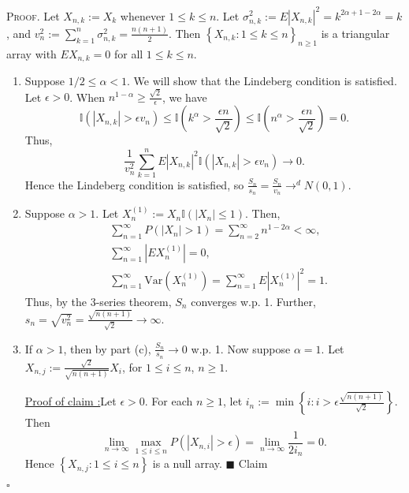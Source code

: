 \documentclass[12pt]{article}
\newcounter{ProofCounter}
\newcounter{ClaimCounter}[ProofCounter]
\newenvironment{Proof}{\stepcounter{ProofCounter}\textsc{Proof.}}{\hfill$\square$}
\newenvironment{claim}[1]{\vspace{1mm}\stepcounter{ClaimCounter}\par\noindent\underline{\bf Claim \theClaimCounter:}\space#1}{}
\newenvironment{claimproof}[1]{\par\noindent\underline{Proof of claim \theClaimCounter:}\space#1}{\hfill $\blacksquare$ Claim \theClaimCounter}
\begin{document}
\begin{Proof}
  Let $X_{n,k} := X_{k}$ whenever $1 \leq k \leq n$. Let $\sigma_{n,k}^{2} := E|X_{n,k}|^{2} = k^{2\alpha + 1 - 2\alpha} = k$, and $v_{n}^{2} :=
  \sum_{k=1}^{n}\sigma_{n,k}^{2} = \frac{n(n+1)}{2}$. Then $\left\{ X_{n,k} : 1 \leq k \leq n \right\}_{n\geq 1}$ is a triangular array with $EX_{n,k}
  = 0$ for all $1 \leq k \leq n$.
  \begin{enumerate}[label = (\alph*)]
    \item Suppose $1/2 \leq \alpha < 1$. We will show that the Lindeberg condition is satisfied. Let $\epsilon > 0$. When $n^{1 - \alpha} \geq
      \frac{\sqrt{2}}{\epsilon}$, we have 
      \[ 
        \mathbb{I}(|X_{n,k}| > \epsilon v_{n}) \leq \mathbb{I}\left(k^{\alpha} > \frac{\epsilon n}{\sqrt{2}}\right) \leq \mathbb{I}\left(n^{\alpha} >
        \frac{\epsilon n}{\sqrt{2}}\right) = 0.
      \]
      Thus,
      \[ \frac{1}{v_{n}^{2}}\sum_{k=1}^{n}E|X_{n,k}|^{2}\mathbb{I}(|X_{n,k}| > \epsilon v_{n}) \rightarrow 0. \]
      Hence the Lindeberg condition is satisfied, so $\frac{S_{n}}{s_{n}} = \frac{S_{n}}{v_{n}} \rightarrow^{d} N(0,1)$.\addtocounter{enumi}{1} 
    \item Suppose $\alpha > 1$. Let $X_{n}^{(1)} := X_{n}\mathbb{I}(|X_{n}| \leq 1)$. Then,
      \begin{align*}
        & \sum_{n=1}^{\infty}P(|X_{n}| > 1) = \sum_{n=2}^{\infty}n^{1-2\alpha} < \infty, \\
        & \sum_{n=1}^{\infty}|EX_{n}^{(1)}| = 0, \\
        & \sum_{n=1}^{\infty}\text{Var}(X_{n}^{(1)}) = \sum_{n=1}^{\infty}E|X_{n}^{(1)}|^{2} = 1.
      \end{align*}
      Thus, by the 3-series theorem, $S_{n}$ converges w.p. 1. Further, $s_{n} = \sqrt{v_{n}^{2}} = \frac{\sqrt{n(n+1)}}{\sqrt{2}} \rightarrow
      \infty$. \addtocounter{enumi}{-2}
      \newpage
    \item If $\alpha > 1$, then by part (c), $\frac{S_{n}}{s_{n}} \rightarrow 0$ w.p. 1. Now suppose $\alpha = 1$. Let $X_{n,j} :=
      \frac{\sqrt{2}}{\sqrt{n(n+1)}}X_{i}$, for $1 \leq i \leq n$, $n \geq 1$.
        \begin{claimproof}
          Let $\epsilon > 0$. For each $n \geq 1$, let $i_{n} := \min\left\{i : i > \epsilon \frac{\sqrt{n(n+1)}}{\sqrt{2}}\right\}$. Then
          \[ \lim_{n\rightarrow\infty}\max_{1\leq i \leq n}P(|X_{n,i}| > \epsilon) = \lim_{n\rightarrow\infty}\frac{1}{2i_{n}} = 0. \]
          Hence $\left\{ X_{n,j} : 1 \leq i\leq n \right\}$ is a null array.
        \end{claimproof}


\end{enumerate}
\end{Proof}
\end{document}
